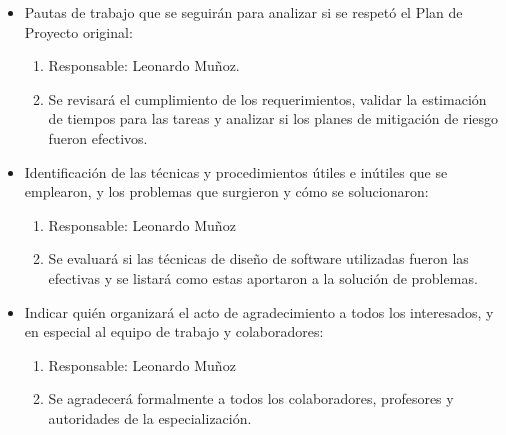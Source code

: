 \documentclass[
11pt, %
codirector, %
]{charter}
\begin{document}
\begin{itemize}
	\item Pautas de trabajo que se seguirán para analizar si se respetó el Plan de Proyecto original:
	
	\begin{enumerate}
	\item Responsable: Leonardo Muñoz.
	\item Se revisará el cumplimiento de los requerimientos, validar la estimación de tiempos para las tareas y analizar si los planes de mitigación de riesgo fueron efectivos.
	\end{enumerate}
	
	\item Identificación de las técnicas y procedimientos útiles e inútiles que se emplearon, y los problemas que surgieron y cómo se solucionaron:
	
	\begin{enumerate}
	\item Responsable: Leonardo Muñoz
	\item Se evaluará si las técnicas de diseño de software utilizadas fueron las efectivas y se listará como estas aportaron a la solución de problemas.
	\end{enumerate}
	
	 
	\item Indicar quién organizará el acto de agradecimiento a todos los interesados, y en especial al equipo de trabajo y colaboradores:
	\begin{enumerate}
	\item Responsable: Leonardo Muñoz
	\item Se agradecerá formalmente a todos los colaboradores, profesores y autoridades de la especialización.
	\end{enumerate}
	  
	  
\end{itemize}
\end{document}
